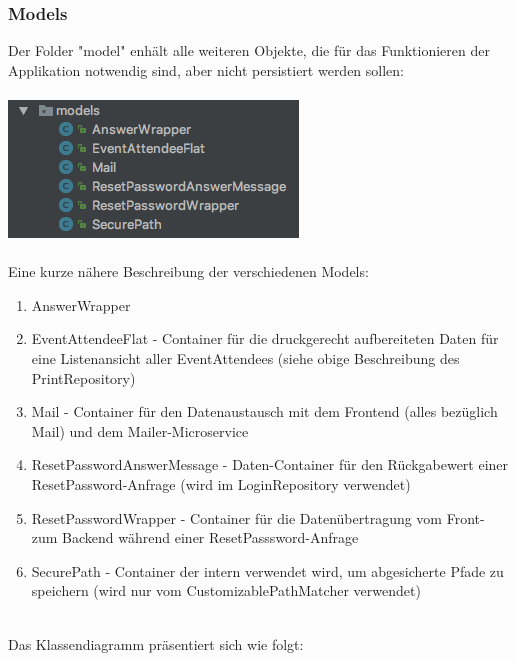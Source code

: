 \documentclass[11pt]{article} %
\begin{document}
\subsubsection{Models}
Der Folder "model" enhält alle weiteren Objekte, die für das Funktionieren der Applikation notwendig sind, aber nicht persistiert werden sollen:
\\
\\
\includegraphics[scale=0.7]{structure_eventmanagement_models}
\\
\\
Eine kurze nähere Beschreibung der verschiedenen Models:
\begin{enumerate}
\item AnswerWrapper
\item EventAttendeeFlat - Container für die druckgerecht aufbereiteten Daten für eine Listenansicht aller EventAttendees (siehe obige Beschreibung des PrintRepository)
\item Mail - Container für den Datenaustausch mit dem Frontend (alles bezüglich Mail) und dem Mailer-Microservice
\item ResetPasswordAnswerMessage - Daten-Container für den Rückgabewert einer ResetPassword-Anfrage (wird im LoginRepository verwendet)
\item ResetPasswordWrapper - Container für die Datenübertragung vom Front- zum Backend während einer ResetPasssword-Anfrage
\item SecurePath - Container der intern verwendet wird, um abgesicherte Pfade zu speichern (wird nur vom CustomizablePathMatcher verwendet)
\end{enumerate} \leavevmode
\\
Das Klassendiagramm präsentiert sich wie folgt:
\\
\\
\end{document}
